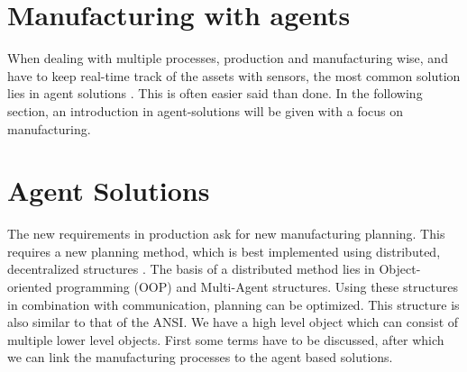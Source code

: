 \section*{Manufacturing with agents}
When dealing with multiple processes, production and manufacturing wise, and have to keep real-time track of the assets with sensors, the most common solution lies in agent solutions \citep{leitao2013past, monostori2016cyber}. This is often easier said than done. In the following section, an introduction in agent-solutions will be given with a focus on manufacturing.
%
%
%
%
\newpage
\section{Agent Solutions}
The new requirements in production ask for new manufacturing planning. This requires a new planning method, which is best implemented using distributed, decentralized structures \citep{parunak1999industrial}. The basis of a distributed method lies in Object-oriented programming (OOP) and Multi-Agent structures. Using these structures in combination with communication, planning can be optimized. This structure is also similar to that of the ANSI. We have a high level object which can consist of multiple lower level objects. First some terms have to be discussed, after which we can link the manufacturing processes to the agent based solutions.

